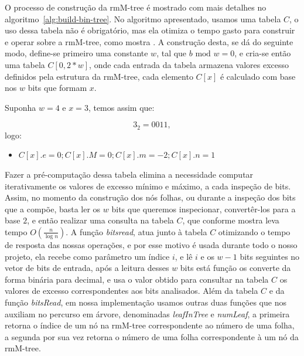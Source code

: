 O processo de construção da rmM-tree é mostrado com mais detalhes no algoritmo~\ref*{alg:build-bin-tree}.
No algoritmo apresentado, usamos uma tabela $C$, o uso dessa tabela não é obrigatório, mas ela otimiza o tempo gasto para construir e operar sobre
a rmM-tree, como mostra \citeauthor{book-compact-data-structures}. A construção desta, se dá do seguinte modo, define-se primeiro uma constante 
$w$, tal que $b \mbox{ mod } w = 0$, e cria-se então uma tabela $C[0, 2*w]$, 
onde cada entrada da tabela armazena valores excesso definidos pela estrutura da rmM-tree, cada elemento $C[x]$ é calculado com base nos $w$ bits 
que formam $x$. 
\begin{example}
    Suponha $w=4$ e $x=3$, temos assim que:

    $$3_2 = 0011,$$  logo:
    \begin{itemize}
        \item $C[x].e = 0; C[x].M = 0; C[x].m = -2; C[x].n = 1$
    \end{itemize}
\end{example}

Fazer a pré-computação dessa tabela elimina a necessidade computar iterativamente os valores de excesso mínimo e máximo, a cada inspeção de bits.
Assim, no momento da construção dos nós folhas, ou durante a inspeção dos bits que a compõe, basta ler os $w$ bits que queremos inspecionar, convertêr-los 
para a base $2$, e então realizar uma consulta na tabela $C$, que conforme mostra \citet{book-compact-data-structures} leva tempo $O(\frac{n}{\log n})$.   
A função \textit{bitsread}, atua junto à tabela $C$ otimizando o tempo de resposta das nossas operações, e por esse motivo é usada durante todo o nosso 
projeto, ela recebe como parâmetro um índice $i$, e lê $i$ e os $w-1$ bits seguintes no vetor de bits de entrada, 
após a leitura desses $w$ bits está função os converte da forma binária para decimal, e usa o valor obtido para consultar na tabela $C$ os valores de excesso 
correspondentes aos bits analisados. Além da tabela $C$ e da função \textit{bitsRead}, em nossa implementação usamos outras duas funções que nos auxiliam no 
percurso em árvore, denominadas \textit{leafInTree}
e \textit{numLeaf}, a primeira retorna o índice de um nó na rmM-tree correspondente ao número de uma folha, a segunda por sua vez retorna o número de uma folha 
correspondente à um nó da rmM-tree.


